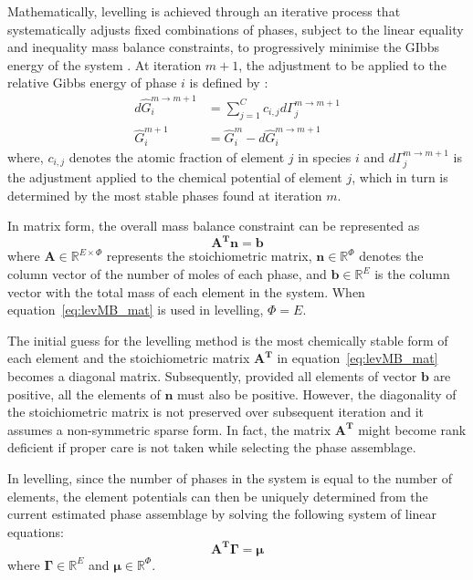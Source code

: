 	Mathematically, levelling is achieved through an iterative process that systematically adjusts fixed combinations of phases, subject to the linear equality and inequality mass balance constraints, to progressively minimise the GIbbs energy of the system \cite{Piro12a}. At iteration $m+1$, the adjustment to be applied to the relative Gibbs energy of phase $i$ is defined by \cite{Eriksson89}:
	\begin{equation} \label{eq:lev_adj}
		\begin{aligned}
			d \hat{G}_i^{m\rightarrow m+1} &= \sum_{j=1}^{C} c_{i,j} d \Gamma_j^{m\rightarrow m+1}\\
			\hat{G}_i^{m+1} &= \hat{G}_i^{m} - d \hat{G}_i^{m\rightarrow m+1}
		\end{aligned}
	\end{equation}
	where, $c_{i,j}$ denotes the atomic fraction of element $j$ in species $i$ and $d \Gamma_j^{m\rightarrow m+1}$ is the adjustment applied to the chemical potential of element $j$, which in turn is determined by the most stable phases found at iteration $m$. 
	
	In  matrix form, the overall mass balance constraint can be represented as \cite{Piro12a}
	\begin{equation} \label{eq:levMB_mat}
		\mathbf{A^T} \mathbf{n}= \mathbf{b}
	\end{equation}
	where $\mathbf{A} \in \mathbb{R}^{E \times \Phi}$ represents the stoichiometric matrix, $\mathbf{n} \in \mathbb{R}^{\Phi }$ denotes the column vector of the number of moles of each phase, and $\mathbf{b} \in \mathbb{R}^{E}$ is the column vector with the total mass of each element in the system. When equation~\ref{eq:levMB_mat} is used in levelling, $\Phi = E$. 
	
	The initial guess for the levelling method is the most chemically stable form of each element and the stoichiometric matrix $\mathbf{A^T}$ in equation~\eqref{eq:levMB_mat} becomes a diagonal matrix. Subsequently, provided all elements of vector $\mathbf{b}$ are positive, all the elements of $\mathbf{n}$ must also be positive. However, the diagonality of the stoichiometric matrix is not preserved over subsequent iteration and it assumes a non-symmetric sparse form. In fact, the matrix $\mathbf{A^T}$ might become rank deficient if proper care is not taken while selecting the phase assemblage.
	
	In levelling, since the number of phases in the system is equal to the number of elements, the element potentials can then be uniquely determined from the current estimated phase assemblage by solving the following system of linear equations:
	\begin{equation} \label{eq:levEP_mat}
		\mathbf{A^T} \boldsymbol{\Gamma} = \boldsymbol{\mu}
	\end{equation}
	where $\boldsymbol{\Gamma} \in \mathbb{R}^{E} $ and $\boldsymbol{\mu} \in \mathbb{R}^{\Phi}$.
	
